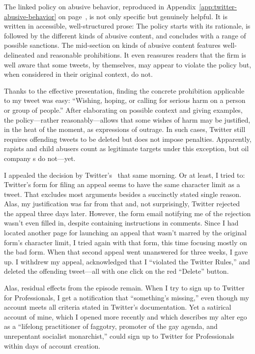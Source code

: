 \noindent{}The linked policy on abusive behavior, reproduced in
Appendix~\ref{app:twitter-abusive-behavior} on
page~\pageref{app:twitter-abusive-behavior}, is not only specific but genuinely
helpful. It is written in accessible, well-structured prose: The policy starts
with its rationale, is followed by the different kinds of abusive content, and
concludes with a range of possible sanctions. The mid-section on kinds of
abusive content features well-delineated and reasonable prohibitions. It even
reassures readers that the firm is well aware that some tweets, by themselves,
may appear to violate the policy but, when considered in their original context,
do not.

Thanks to the effective presentation, finding the concrete prohibition
applicable to my tweet was easy: ``Wishing, hoping, or calling for serious harm
on a person or group of people.'' After elaborating on possible context and
giving examples, the policy---rather reasonably---allows that some wishes of
harm may be justified, in the heat of the moment, as expressions of outrage. In
such cases, Twitter still requires offending tweets to be deleted but does not
impose penalties. Apparently, rapists and child abusers count as legitimate
targets under this exception, but oil company s do not---yet.

I appealed the decision by Twitter's \AI\ that same morning. Or at least, I
tried to: Twitter's form for filing an appeal seems to have the same character
limit as a tweet. That excludes most arguments besides a succinctly stated
single reason. Alas, my justification was far from that and, not surprisingly,
Twitter rejected the appeal three days later. However, the form email notifying
me of the rejection wasn't even filled in, despite containing instructions in
 comments. Since I had located another page for launching an appeal that
wasn't marred by the original form's character limit, I tried again with that
form, this time focusing mostly on the bad form. When that second appeal went
unanswered for three weeks, I gave up. I withdrew my appeal, acknowledged that I
``violated the Twitter Rules,'' and deleted the offending tweet---all with one
click on the red ``Delete'' button.

Alas, residual effects from the episode remain. When I try to sign up to Twitter
for Professionals, I get a notification that ``something's missing,'' even
though my account meets all criteria stated in Twitter's documentation. Yet a
satirical account of mine, which I opened more recently and which describes my
alter ego as a ``lifelong practitioner of faggotry, promoter of the gay agenda,
and unrepentant socialist monarchist,'' could sign up to Twitter for
Professionals within days of account creation.


